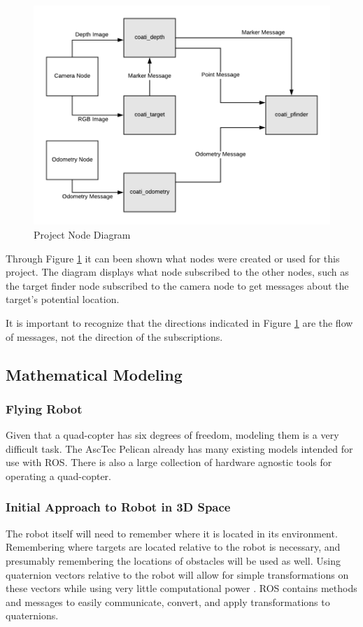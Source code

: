 \documentclass{article}[12]
\begin{document}
	\begin{figure}[H]
		\centering
		\includegraphics[width=0.8\linewidth]{NodeDiagram}
		\caption{Project Node Diagram}
		\label{fig:nodediagram}
	\end{figure}


	Through Figure \ref{fig:nodediagram} it can been shown what nodes were created or used for this project. The diagram displays what node subscribed to the other nodes, such as the target finder node subscribed to the camera node to get messages about the target's potential location. 
	
 	It is important to recognize that the directions indicated in Figure \ref{fig:nodediagram} are the flow of messages, not the direction of the subscriptions. 

	\subsection{Mathematical Modeling}
	
		\subsubsection{Flying Robot}
	
		Given that a quad-copter has six degrees of freedom, modeling them is a very difficult task. The AscTec Pelican already has many existing models intended for use with ROS. There is also a large collection of hardware agnostic tools for operating a quad-copter.
	
		\subsubsection{Initial Approach to Robot in 3D Space}
		
		The robot itself will need to remember where it is located in its environment. Remembering where targets are located relative to the robot is necessary, and presumably remembering the locations of obstacles will be used as well. Using quaternion vectors relative to the robot will allow for simple transformations on these vectors while using very little computational power \cite{williams2010combining}. ROS contains methods and messages to easily communicate, convert, and apply transformations to quaternions.
		
\end{document}
